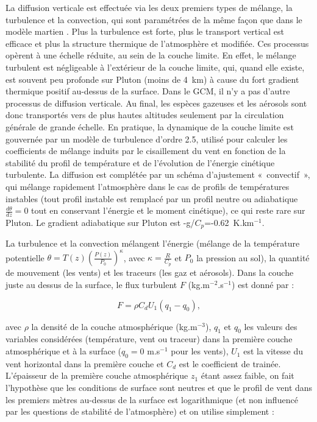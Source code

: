 \vspace{0.5cm}

La diffusion verticale est effectuée via les deux premiers types de mélange, la turbulence et la convection, qui sont paramétrées de la même façon que dans le modèle martien \citep{Forg:99}. Plus la turbulence est forte, plus le transport vertical est efficace et plus la structure thermique de l’atmosphère et modifiée.
Ces processus opèrent à une échelle réduite, au sein de la couche limite. En effet, le mélange turbulent est négligeable à l’extérieur de la couche limite, qui, quand elle existe, est souvent peu profonde sur Pluton (moins de 4~km) à cause du fort gradient thermique positif au-dessus de la surface. Dans le GCM, il n’y a pas d’autre processus de diffusion verticale. Au final, les espèces gazeuses et les aérosols sont donc transportés vers de plus hautes altitudes seulement par la circulation générale de grande échelle. 
En pratique, la dynamique de la couche limite est gouvernée par un modèle de turbulence \citet{MellYama:82} d'ordre 2.5, utilisé pour calculer les coefficients de mélange induits par le cisaillement du vent en fonction de la stabilité du profil de température et de l’évolution de l’énergie cinétique turbulente. 
La diffusion est complétée par un schéma d’ajustement «~convectif~», qui mélange rapidement l’atmosphère dans le cas de profils de températures instables (tout profil instable est remplacé par un profil neutre ou adiabatique $\frac{d\theta}{dz}= 0$ tout en conservant l’énergie et le moment cinétique),  ce qui reste rare sur Pluton. Le gradient adiabatique sur Pluton est -g/$C_p$=-0.62~K.km$^{-1}$.

\vspace{0.5cm}

La turbulence et la convection mélangent l’énergie (mélange de la température potentielle $\theta = T(z) (\frac{P(z)}{P_0})^\kappa$, avec $\kappa=\frac{R}{C_p}$ et $P_0$ la pression au sol), la quantité de mouvement (les vents) et les traceurs (les gaz et aérosols). 
Dans la couche juste au dessus de la surface, le flux turbulent $F$ (kg.m$^{-2}$.s$^{-1}$) est donné par :

\begin{equation}
F = \rho C_d  U_1 (q_1 -q_0), 
\label{eq:sflux}
\end{equation}

avec $\rho$ la densité de la couche atmosphérique (kg.m$^{-3}$), $q_1$ et $q_0$ les valeurs des variables considérées (température, vent ou traceur) dans la première couche atmosphérique et à la surface ($q_0=0$ m.s$^{-1}$ pour les vents), $U_1$ est la vitesse du vent horizontal dans la première couche et $C_d$ est le coefficient de trainée. L’épaisseur de la première couche atmosphérique $z_1$ étant assez faible, on fait l’hypothèse que les conditions de surface sont neutres et que le profil de vent dans les premiers mètres au-dessus de la surface est logarithmique (et non influencé par les questions de stabilité de l’atmosphère) et on utilise simplement :

